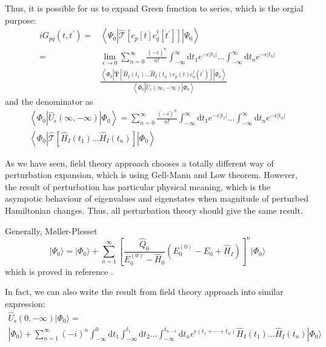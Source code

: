 \documentclass[bachelor, english]{ustcthesis}
\begin{document}
Thus, it is possible for us to expand Green function to series, which is the orgial purpose:
$$
\begin{aligned}
	i G_{p q}\left(t, t^{\prime}\right)
	=&\left\langle\Psi_{0}\left|
	\hat{\mathcal{T}}\left[c_{p}[t] c_{q}^{\dagger}\left[t^{\prime}\right]\right]\right|
	\Psi_{0}\right\rangle
	\\
	=& \lim _{\epsilon \rightarrow 0} \sum_{n=0}^{\infty} \frac{(-i)^{n}}{n !} 
	\int_{-\infty}^{\infty} \mathrm{d} t_{1} e^{-\epsilon\left|t_{1}\right|} \ldots \int_{-\infty}^{\infty} \mathrm{d} t_{n} e^{-\epsilon\left|t_{n}\right|}
	\\
	& \frac{\left\langle\Phi_{0}\left|
	\hat{\boldsymbol{T}}\left[\hat{H}_{I}\left(t_{1}\right) \ldots \hat{H}_{I}\left(t_{n}\right) c_{p}(t) c_{q}^{\dagger}\left(t^{\prime}\right)\right]\right|
	\Phi_{0}\right\rangle}
	{\left\langle\Phi_{0}\left|
	\hat{U}_{\epsilon}(\infty,-\infty)\right|
	\Phi_{0}\right\rangle}
\end{aligned}
$$
and the denominator as
$$
\begin{aligned}\left\langle\Phi_{0}\left|\hat{U}_{\epsilon}(\infty,-\infty)\right| \Phi_{0}\right\rangle=\sum_{n=0}^{\infty} \frac{(-i)^{n}}{n !} \int_{-\infty}^{\infty} \mathrm{d} t_{1} e^{-\epsilon\left|t_{1}\right|} \ldots \int_{-\infty}^{\infty} \mathrm{d} t_{n} e^{-\epsilon\left|t_{n}\right|} \\\left\langle\Phi_{0}\left|\hat{\mathcal{T}}\left[\hat{H}_{I}\left(t_{1}\right) \ldots \hat{H}_{I}\left(t_{n}\right)\right]\right| \Phi_{0}\right\rangle \end{aligned}
$$

As we have seen, field theory approach chooses a totally different way of perturbation expansion, which is using Gell-Mann and Low theorem.
However, the result of perturbation has particular physical meaning, which is the asympotic behaviour of eigenvalues and eigenstates when magnitude of perturbed Hamiltonian changes.
Thus, all perturbation theory should give the same result.

Generally, M{\o}ller-Plesset
$$
| \Psi_{0} \rangle=| \Phi_{0} \rangle+\sum_{n=1}^{\infty}\left[\frac{\hat{Q}_{0}}{E_{0}^{(0)}-\hat{H}_{0}}\left(E_{0}^{(0)}-E_{0}+\hat{H}_{I}\right)\right]^{n} | \Phi_{0} \rangle
$$
which is proved in reference \cite{rsptproof}.

In fact, we can also write the result from field theory approach into similar expression:
\begin{equation} \label{expansion}
\begin{array}{l}{\hat{U}_{\epsilon}(0,-\infty) | \Phi_{0} \rangle=} \\ { | \Phi_{0} \rangle+\sum_{n=1}^{\infty}(-i)^{n} \int_{-\infty}^{0} \mathrm{d} t_{1} \int_{-\infty}^{t_{1}} \mathrm{d} t_{2} \ldots \int_{-\infty}^{t_{n-1}} \mathrm{d} t_{n} e^{\epsilon\left(t_{1}+\cdots+t_{n}\right)} \hat{H}_{I}\left(t_{1}\right) \ldots \hat{H}_{I}\left(t_{n}\right) | \Phi_{0} \rangle}\end{array}
\end{equation}
\end{document}
